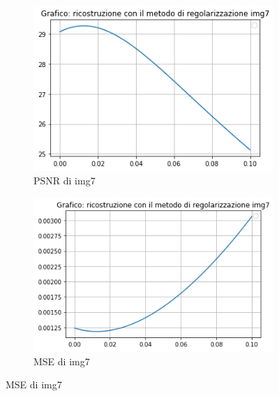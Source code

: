 \begin{figure}[H]
    \begin{subfigure}{0.5\textwidth}
        \centering
        \includegraphics[width=\textwidth]{output/PSNR/outputPSNR-img7.png}
        \caption{PSNR di img7}
        \label{fig:img7PSNR}
    \end{subfigure}\hfill
    \begin{subfigure}{0.5\textwidth}
        \centering
        \includegraphics[width=\textwidth]{output/MSE/outputMSE-img7.png}
        \caption{MSE di img7}
        \label{fig:img7MSE}
    \end{subfigure}


\end{figure}
